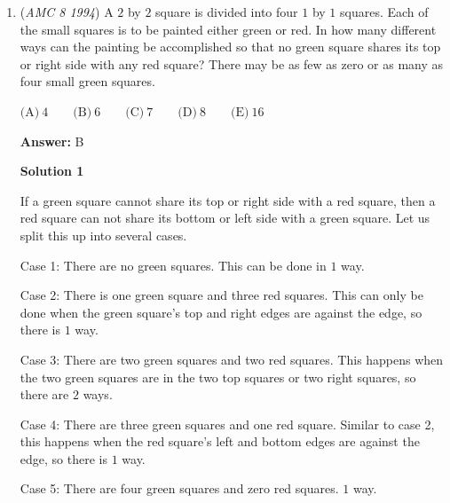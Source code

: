 \begin{enumerate}
 


 has the form


 $\text{(A)}\ XXY \qquad \text{(B)}\ XYZ \qquad \text{(C)}\ YYX \qquad \text{(D)}\ YYZ \qquad \text{(E)}\ ZZY$

 \textbf{Answer: }D



\textbf{Solution}

The sum can be rewritten as $113X + 10Y$. To get the largest possible sum, we maximize the hundreds digit, $X$. If $X=9$, the sum is a $4$-digit number, so we let $X=8$ and $113(8)+10Y = 904+10Y$. To continue maxmimizing this sum, we can let $Y=9$, a different digit from $X$, and $904+10(9)=994$, which has the form $\boxed{\text{(D)}\ YYZ}$.

 


	\item (\textit{AMC 8 1994}) A $2$ by $2$ square is divided into four $1$ by $1$ squares.  Each of the small squares is to be painted either green or red.  In how many different ways can the painting be accomplished so that no green square shares its top or right side with any red square?  There may be as few as zero or as many as four small green squares.


 $\text{(A)}\  4 \qquad \text{(B)}\ 6 \qquad \text{(C)}\ 7 \qquad \text{(D)}\ 8 \qquad \text{(E)}\ 16$

 \textbf{Answer: }B



\textbf{Solution 1}

If a green square cannot share its top or right side with a red square, then a red square can not share its bottom or left side with a green square. Let us split this up into several cases.

 Case 1: There are no green squares. This can be done in $1$ way.

 Case 2: There is one green square and three red squares. This can only be done when the green square's top and right edges are against the edge, so there is $1$ way.

 Case 3: There are two green squares and two red squares. This happens when the two green squares are in the two top squares or two right squares, so there are $2$ ways.

 Case 4: There are three green squares and one red square. Similar to case 2, this happens when the red square's left and bottom edges are against the edge, so there is $1$ way.

 Case 5: There are four green squares and zero red squares.   $1$ way.


\end{enumerate}
